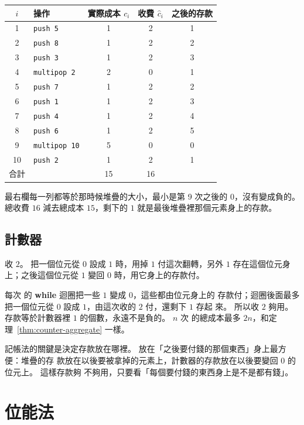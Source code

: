 \begin{center}
\begin{tabular}{clccc}
\toprule
$i$ & 操作 & 實際成本 $c_i$ & 收費 $\hat{c}_i$ & 之後的存款 \\
\midrule
1 & \texttt{push 5} & 1 & 2 & 1 \\
2 & \texttt{push 8} & 1 & 2 & 2 \\
3 & \texttt{push 3} & 1 & 2 & 3 \\
4 & \texttt{multipop 2} & 2 & 0 & 1 \\
5 & \texttt{push 7} & 1 & 2 & 2 \\
6 & \texttt{push 1} & 1 & 2 & 3 \\
7 & \texttt{push 4} & 1 & 2 & 4 \\
8 & \texttt{push 6} & 1 & 2 & 5 \\
9 & \texttt{multipop 10} & 5 & 0 & 0 \\
10 & \texttt{push 2} & 1 & 2 & 1 \\
\midrule
合計 & & 15 & 16 & \\
\bottomrule
\end{tabular}
\end{center}

最右欄每一列都等於那時候堆疊的大小，最小是第 9 次之後的 $0$，沒有變成負的。 總收費
$16$ 減去總成本 $15$，剩下的 $1$ 就是最後堆疊裡那個元素身上的存款。

\subsection{計數器}

 收 $2$。 把一個位元從 $0$ 設成 $1$ 時，用掉 $1$ 付這次翻轉，另外
$1$ 存在這個位元身上；之後這個位元從 $1$ 變回 $0$ 時，用它身上的存款付。

每次  的 \textbf{while} 迴圈把一些 $1$ 變成 $0$，這些都由位元身上的
存款付；迴圈後面最多把一個位元從 $0$ 設成 $1$，由這次收的 $2$ 付，還剩下 $1$ 存起
來。 所以收 $2$ 夠用。 存款等於計數器裡 $1$ 的個數，永遠不是負的。 $n$ 次
 的總成本最多 $2n$，和定理~\ref{thm:counter-aggregate} 一樣。

記帳法的關鍵是決定存款放在哪裡。 放在「之後要付錢的那個東西」身上最方便：堆疊的存
款放在以後要被拿掉的元素上，計數器的存款放在以後要變回 $0$ 的位元上。 這樣存款夠
不夠用，只要看「每個要付錢的東西身上是不是都有錢」。

\section{位能法}
\label{sec:amo-potential}

